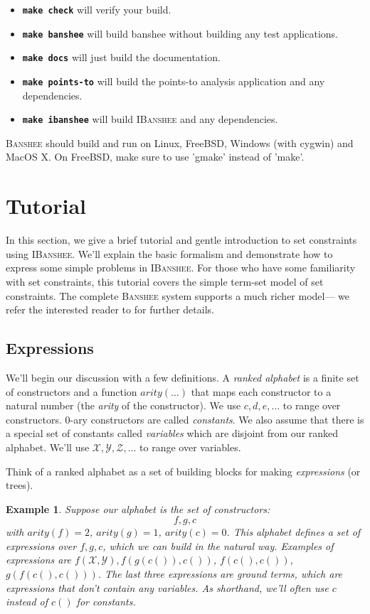 \documentclass{article}
\newcommand{\banshee}{\textsc{Banshee}}
\newcommand{\ibanshee}{\textsc{IBanshee}}
\newcommand{\cmd}[1]{\texttt{\textbf{#1}}}
\newcommand{\var}[1]{\mathcal{#1}}
\newtheorem{example}{Example}
\begin{document}
\begin{itemize}
\item \cmd{make check} will verify your build.
\item \cmd{make banshee} will build banshee without building any test
  applications.
\item \cmd{make docs} will just build the documentation.
\item \cmd{make points-to} will build the points-to analysis
  application and any dependencies.
\item \cmd{make ibanshee} will build \ibanshee{} and any dependencies.
\end{itemize}

\banshee{} should build and run on Linux, FreeBSD, Windows (with
cygwin) and MacOS X. On FreeBSD, make sure to use 'gmake' instead of
'make'.

\section{Tutorial}

In this section, we give a brief tutorial and gentle introduction to
set constraints using \ibanshee{}. We'll explain the basic formalism
and demonstrate how to express some simple problems in
\ibanshee{}. For those who have some familiarity with set constraints,
this tutorial covers the simple term-set model of set constraints. The
complete \banshee{} system supports a much richer model--- we refer
the interested reader to \cite{fahndrich:thesis} for further
details.

\subsection{Expressions}

We'll begin our discussion with a few definitions. A \emph{ranked
  alphabet} is a finite set of constructors and a function
$arity(...)$ that maps each constructor to a natural number (the
\emph{arity} of the constructor). We use $c,d,e,\ldots$ to range over
constructors. $0$-ary constructors are called \emph{constants}. We
also assume that there is a special set of constants called
\emph{variables} which are disjoint from our ranked alphabet. We'll
use $\var{X}, \var{Y}, \var{Z}, \ldots$ to range over variables.

Think of a ranked alphabet as a set of building blocks for making
\emph{expressions} (or trees). 

\begin{example}
Suppose our alphabet is the set of constructors:
\[
f,g,c
\]
with $arity(f) =2$, $arity(g) = 1$, $arity(c) = 0$. This alphabet
defines a set of expressions over $f,g,c$, which we can build in the
natural way. Examples of expressions are $f(\var{X},\var{Y}),
f(g(c()),c())$, $f(c(),c())$, $g(f(c(),c()))$. The last three
expressions are \emph{ground terms}, which are expressions that don't
contain any variables. As shorthand, we'll often use $c$ instead of
$c()$ for constants.
\end{example}
\end{document}
